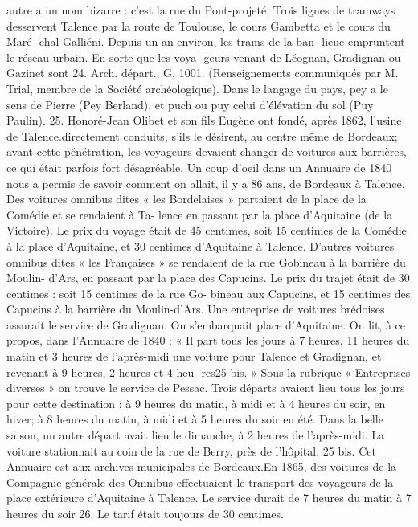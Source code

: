 \documentclass[a4paper,11pt]{book}
\begin{document}
autre a un nom bizarre : c'est la rue du Pont-projeté.
Trois lignes de tramways desservent Talence par la
route de Toulouse, le cours Gambetta et le cours du Maré-
chal-Galliéni. Depuis un an environ, les trams de la ban-
lieue empruntent le réseau urbain. En sorte que les voya-
geurs venant de Léognan, Gradignan ou Gazinet sont
24. Arch. départ., G, 1001. (Renseignements communiqués par M. Trial,
membre de la Société archéologique).
Dans le langage du pays, pey a le sens de Pierre (Pey Berland), et
puch ou puy celui d'élévation du sol (Puy Paulin).
25. Honoré-Jean Olibet et son fils Eugène ont fondé, après 1862,
l'usine de Talence.directement conduits, s'ils le désirent, au centre même de
Bordeaux; avant cette pénétration, les voyageurs devaient
changer de voitures aux barrières, ce qui était parfois fort
désagréable.
Un coup d'oeil dans un Annuaire de 1840 nous a permis
de savoir comment on allait, il y a 86 ans, de Bordeaux
à Talence. Des voitures omnibus dites « les Bordelaises »
partaient de la place de la Comédie et se rendaient à Ta-
lence en passant par la place d'Aquitaine (de la Victoire).
Le prix du voyage était de 45 centimes, soit 15 centimes
de la Comédie à la place d'Aquitaine, et 30 centimes
d'Aquitaine à Talence.
D'autres voitures omnibus dites « les Françaises » se
rendaient de la rue Gobineau à la barrière du Moulin-
d'Ars, en passant par la place des Capucins. Le prix du
trajet était de 30 centimes : soit 15 centimes de la rue Go-
bineau aux Capucins, et 15 centimes des Capucins à la
barrière du Moulin-d'Ars.
Une entreprise de voitures brédoises assurait le service
de Gradignan. On s'embarquait place d'Aquitaine. On lit,
à ce propos, dans l'Annuaire de 1840 :
« Il part tous les jours à 7 heures, 11 heures du matin
et 3 heures de l'après-midi une voiture pour Talence et
Gradignan, et revenant à 9 heures, 2 heures et 4 heu-
res25 bis. »
Sous la rubrique « Entreprises diverses » on trouve le
service de Pessac. Trois départs avaient lieu tous les jours
pour cette destination : à 9 heures du matin, à midi et à
4 heures du soir, en hiver; à 8 heures du matin, à midi
et à 5 heures du soir en été. Dans la belle saison, un autre
départ avait lieu le dimanche, à 2 heures de l'après-midi.
La voiture stationnait au coin de la rue de Berry, près
de l'hôpital.
25 bis. Cet Annuaire est aux archives municipales de Bordeaux.En 1865, des voitures de la Compagnie générale des
Omnibus effectuaient le transport des voyageurs de la
place extérieure d'Aquitaine à Talence. Le service durait
de 7 heures du matin à 7 heures du soir 26. Le tarif était
toujours de 30 centimes.
\end{document}
